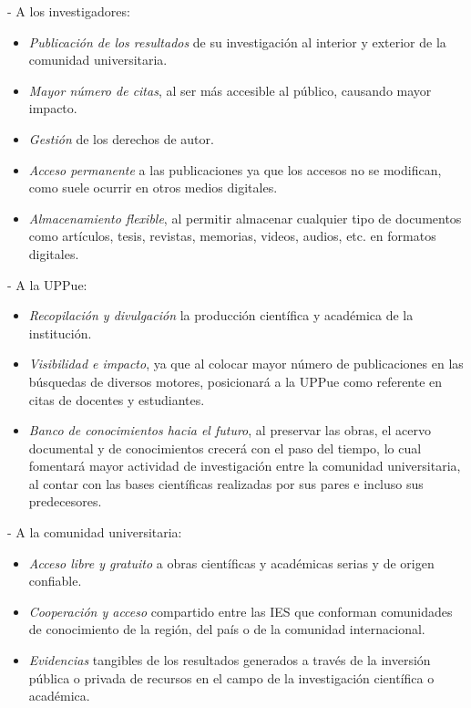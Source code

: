 - A los investigadores: 
	\begin{itemize}
	\item \textit{Publicación de los resultados} de su investigación al interior y exterior de la comunidad universitaria.
    \item \textit{Mayor número de citas}, al ser más accesible al público, causando mayor impacto.
    \item \textit{Gestión} de los derechos de autor.
    \item \textit{Acceso permanente} a las publicaciones ya que los accesos no se modifican, como suele ocurrir en otros medios digitales.
    \item \textit{Almacenamiento flexible}, al permitir almacenar cualquier tipo de documentos como artículos, tesis, revistas, memorias, videos, audios, etc. en formatos digitales.
	\end{itemize}
	
- A la UPPue:
	\begin{itemize}
	\item \textit{Recopilación y divulgación} la producción científica y académica de la institución.
    \item \textit{Visibilidad e impacto}, ya que al colocar mayor número de publicaciones en las búsquedas de diversos motores, posicionará a la UPPue como referente en citas de docentes y estudiantes.
    \item \textit{Banco de conocimientos hacia el futuro}, al preservar las obras, el acervo do\-cu\-mental y de conocimientos crecerá con el paso del tiempo, lo cual fomentará mayor actividad de investigación entre la comunidad universitaria, al contar con las bases científicas realizadas por sus pares e incluso sus predecesores.
	\end{itemize}
	
- A la comunidad universitaria:
  \begin{itemize}
  \item \textit{Acceso libre y gratuito} a obras científicas y académicas serias y de origen confiable.
  \item \textit{Cooperación y acceso} compartido entre las IES que conforman comunidades de conocimiento de la región, del país o de la comunidad internacional.
  \item \textit{Evidencias} tangibles de los resultados generados a través de la inversión pública o privada de recursos en el campo de la investigación científica o académica.
  \end{itemize}

